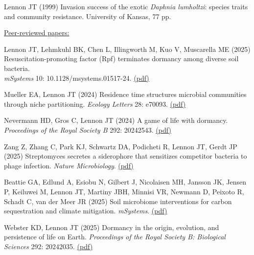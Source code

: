 \documentclass[11pt]{article}
\begin{document}
\begin{etaremune}
\item Lennon JT (1999) Invasion success of the exotic \textit{Daphnia lumholtzi}: species traits and community resistance. University of Kansas, 77 pp.


\vspace{1em}
\item[] \textnormal{\underline{Peer-reviewed papers:}}

\item Lennon JT, Lehmkuhl BK, Chen L, Illingworth M, Kuo V, Muscarella ME (2025) \\Resuscitation-promoting factor (Rpf) terminates dormancy among diverse soil bacteria.\\
\textit{mSystems} 10: 10.1128/msystems.01517-24. \href{https://lennonlab.github.io/assets/publications/Lennon_etal_2025b.pdf}{(pdf)}

\item Mueller EA, Lennon JT (2024) Residence time structures microbial communities through niche partitioning. \textit{Ecology Letters} 28: e70093. \href{https://lennonlab.github.io/assets/publications/Mueller_Lennon_2025.pdf}{(pdf)}

\item Nevermann HD, Gros C, Lennon JT (2024) A game of life with dormancy. \textit{Proceedings of the Royal Society B} 292: 20242543. \href{https://lennonlab.github.io/assets/publications/Nevermann_etal_2025.pdf}{(pdf)}

\item Zang Z, Zhang C, Park KJ, Schwartz DA, Podicheti R, Lennon JT, Gerdt JP (2025) Streptomyces secretes a siderophore that sensitizes competitor bacteria to phage infection. \textit{Nature Microbiology}. \href{https://lennonlab.github.io/assets/publications/Zang_etal_2025.pdf}{(pdf)}

\item Beattie GA, Edlund A, Esiobu N, Gilbert J, Nicolaisen MH, Jansson JK, Jensen P, Keiluwei M, Lennon JT, Martiny JBH, Minnisi VR, Newmann D, Peixoto R, Schadt C, van der Meer JR (2025) Soil microbiome interventions for carbon sequestration and climate mitigation. \textit{mSystems}. \href{https://lennonlab.github.io/assets/publications/Beattie_etal_2025.pdf}{(pdf)}

\item Webster KD, Lennon JT (2025) Dormancy in the origin, evolution, and persistence of life on Earth. \textit{Proceedings of the Royal Society B: Biological Sciences} 292: 20242035. \href{https://lennonlab.github.io/assets/publications/Webster_Lennon_2025.pdf}{(pdf)}


\end{etaremune}
\end{document}

